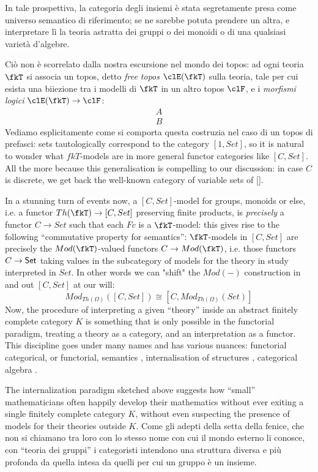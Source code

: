 \documentclass{amsart}
\begin{document}
In tale prospettiva, la categoria degli insiemi è stata segretamente presa come universo semantico di riferimento; se ne sarebbe potuta prendere un altra, e interpretare lì la teoria astratta dei gruppi o dei monoidi o di una qualsiasi varietà d'algebre.

Ciò non è scorrelato dalla nostra escursione nel mondo dei topos: ad ogni teoria $\fkT$ si associa un topos, detto \emph{free topos} $\clE(\fkT)$ sulla teoria, tale per cui esista una biiezione tra i modelli di $\fkT$ in un altro topos $\clF$, e i \emph{morfismi logici} $\clE(\fkT) \to \clF$:
\[\begin{array}{c}
  A \\ \hline  B
\end{array}\]
Vediamo esplicitamente come si comporta questa costruzia nel caso di un topos di prefasci: sets tautologically correspond to the category $[1,Set]$, so it is natural to wonder what $fkT$-models are in more general functor categories like $[C,Set]$. All the more because this generalisation is compelling to our discussion: in case $C$ is discrete, we get back the well-known category of variable sets of \ref{}.

In a stunning turn of events now, a $[C,Set]$-model for groups, monoids or else, i.e. a functor $Th(\fkT)\to [C,Set]$ preserving finite products, is \emph{precisely} a functor $C\to Set$ such that each $Fc$ is a $\fkT$-model: this gives rise to the following ``commutative property for semantics'': $\fkT$-models in $[C,Set]$ are precisely the $Mod(\fkT)$-valued functors $C\to Mod(\fkT)$, i.e. those functors $C \to \mathsf{Set}$ taking values in the subcategory of models for the theory in study interpreted in $Set$. In other words we can "shift" the $Mod(-)$ construction in and out $[C,Set]$ at our will:
\[ 
  Mod_{Th(\Omega)}([C,Set]) \cong [C, Mod_{Th(\Omega)}(Set)]
\]
Now, the procedure of interpreting a given ``theory'' inside an abstract finitely complete category $K$ is something that is only possible in the functorial paradigm, treating a theory as a category, and an interpretation as a functor. This discipline goes under many names and has various nuances: functorial categorical, or functorial, semantics \cite{}, internalisation of structures \cite{}, categorical algebra \cite{}.

The internalization paradigm sketched above suggests how ``small'' mathematicians often happily develop their mathematics without ever exiting a single finitely complete category $K$, without even suspecting the presence of models for their theories outside $K$. Come gli adepti della setta della fenice, che non si chiamano tra loro con lo stesso nome con cui il mondo esterno li conosce, con ``teoria dei gruppi'' i categoristi intendono una struttura diversa e più profonda da quella intesa da quelli per cui un gruppo è un insieme.
\end{document}
